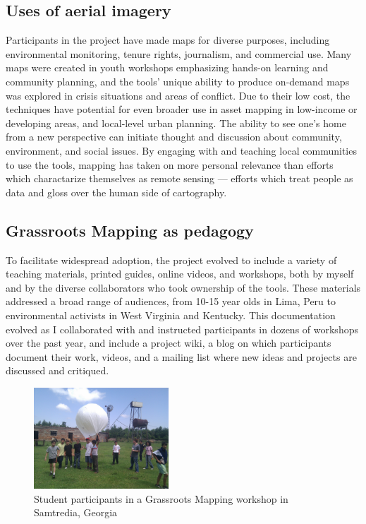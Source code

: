 \documentclass[11pt,oneside,notitlepage]{report}
\begin{document}
{{\subsection{Uses of aerial imagery}

Participants in the project have made maps for diverse purposes, including environmental monitoring, tenure rights, journalism, and commercial use. Many maps were created in youth workshops emphasizing hands-on learning and community planning, and the tools' unique ability to produce on-demand maps was explored in crisis situations and areas of conflict. Due to their low cost, the techniques have potential for even broader use in asset mapping in low-income or developing areas, and local-level urban planning. The ability to see one's home from a new perspective can initiate thought and discussion about community, environment, and social issues. By engaging with and teaching local communities to use the tools, mapping has taken on more personal relevance than efforts which charactarize themselves as remote sensing --- efforts which treat people as data and gloss over the human side of cartography. 
 
\subsection{Grassroots Mapping as pedagogy}

To facilitate widespread adoption, the project evolved to include a variety of teaching materials, printed guides, online videos, and workshops, both by myself and by the diverse collaborators who took ownership of the tools. These materials addressed a broad range of audiences, from 10-15 year olds in Lima, Peru to environmental activists in West Virginia and Kentucky. This documentation evolved as I collaborated with and instructed participants in dozens of workshops over the past year, and include a project wiki, a blog on which participants document their work, videos, and a mailing list where new ideas and projects are discussed and critiqued.

\begin{figure}
	\begin{flushright}
		\includegraphics[width=0.45\textwidth]{images/samtredia.jpg}
	\caption{Student participants in a Grassroots Mapping workshop in Samtredia, Georgia}
	\end{flushright}
\end{figure}

}}
\end{document}
